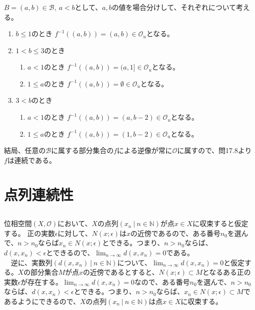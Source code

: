 \documentclass{jsarticle}
\begin{document}
\subsubsection{}
$B=(a,b)\in\mathcal{B},\ a<b$として、$a,b$の値を場合分けして、それぞれについて考える。
\begin{enumerate}
\item{$b\leq 1$のとき}
$f^{-1}((a,b))=(a,b)\in\mathcal{O}_u$となる。
\item{$1<b\leq 3$のとき}
\begin{enumerate}
\item{$a<1$のとき}
$f^{-1}((a,b))=(a,1]\in\mathcal{O}_u$となる。
\item{$1\leq a$のとき}
$f^{-1}((a,b))=\emptyset\in\mathcal{O}_u$となる。
\end{enumerate}
\item{$3<b$のとき}
\begin{enumerate}
\item{$a<1$のとき}
$f^{-1}((a,b))=(a,b-2)\in\mathcal{O}_u$となる。
\item{$1\leq a$のとき}
$f^{-1}((a,b))=(1,b-2)\in\mathcal{O}_u$となる。
\end{enumerate}
\end{enumerate}
結局、任意の$\mathcal{B}$に属する部分集合の$f$による逆像が常に$\mathcal{O}$に属すので、問17.8より$f$は連続である。


\section{点列連続性}
\subsection{}
位相空間$(X,\mathcal{O})$において、$X$の点列$(x_n\ |\ n\in\mathbb{N})$が点$x\in X$に収束すると仮定する。
正の実数$\epsilon$に対して、$N(x;\epsilon)$は$x$の近傍であるので、ある番号$n_0$を選んで、$n>n_0$ならば$x_n\in N(x;\epsilon)$とできる。つまり、$n>n_0$ならば、$d(x,x_n)<\epsilon$とできるので、$\lim_{n\to\infty}d(x,x_n)=0$である。\\
　逆に、実数列$(d(x,x_n)\ |\ n\in\mathbb{N})$について、$\lim_{n\to\infty}d(x,x_n)=0$と仮定する。$X$の部分集合$M$が点$x$の近傍であるとすると、$N(x;\epsilon)\subset M$となるある正の実数$\epsilon$が存在する。$\lim_{n\to\infty}d(x,x_n)=0$なので、ある番号$n_0$を選んで、$n>n_0$ならば、$d(x,x_n)<\epsilon$とできる。つまり、$n>n_0$ならば、$x_n\in N(x;\epsilon)\subset M$であるようにできるので、$X$の点列$(x_n\ |\ n\in\mathbb{N})$は点$x\in X$に収束する。
\end{document}
